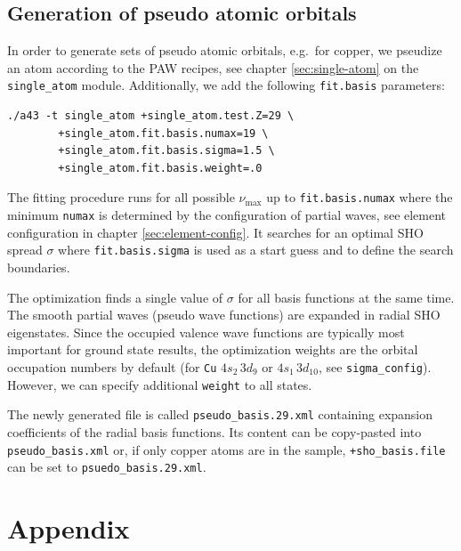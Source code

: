 \documentclass[oribibl]{llncs}
\newcommand{\um}[1]{_{\mathrm{#1}}}
\newcommand{\ttt}[1]{\texttt{#1}}
\begin{document}
\subsection{Generation of pseudo atomic orbitals}
In order to generate sets of pseudo atomic orbitals, e.g.~for copper, we pseudize an atom according to the \ac{PAW} recipes, see chapter \ref{sec:single-atom} on the \ttt{single\_atom} module.
Additionally, we add the following \ttt{fit.basis} parameters:
\begin{verbatim}
./a43 -t single_atom +single_atom.test.Z=29 \
        +single_atom.fit.basis.numax=19 \
        +single_atom.fit.basis.sigma=1.5 \
        +single_atom.fit.basis.weight=.0 
\end{verbatim}
The fitting procedure runs for all possible $\nu\um{max}$ up to \ttt{fit.basis.numax}
where the minimum \ttt{numax} is determined by the configuration of partial waves, see element configuration in chapter \ref{sec:element-config}. 
It searches for an optimal \ac{SHO} spread $\sigma$ where \ttt{fit.basis.sigma} is used as a start guess and to define the search boundaries.

The optimization finds a single value of $\sigma$ for all basis functions at the same time.
The smooth partial waves (pseudo wave functions) are expanded in radial \ac{SHO} eigenstates.
Since the occupied valence wave functions are typically most important for ground state results,
the optimization weights are the orbital occupation numbers by default 
(for \ttt{Cu} $4s_{2} \, 3d_{9}$ or $4s_{1} \, 3d_{10}$, see \ttt{sigma\_config}).
However, we can specify additional \ttt{weight} to all states.

The newly generated file is called \ttt{pseudo\_basis.29.xml} containing expansion coefficients of
the radial basis functions. Its content can be copy-pasted into \ttt{pseudo\_basis.xml}
or, if only copper atoms are in the sample, \ttt{+sho\_basis.file} can be set to \ttt{psuedo\_basis.29.xml}.

\newpage

\appendix
%
\section{Appendix}
%
\end{document}
